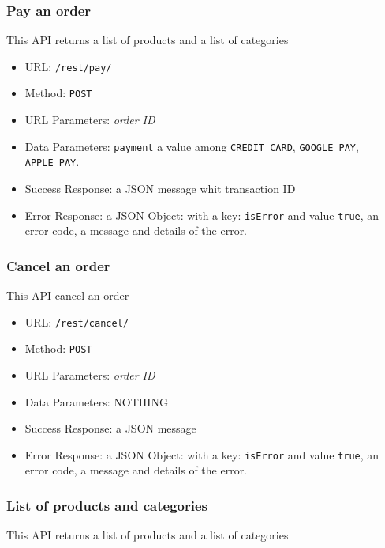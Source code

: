 \subsubsection*{Pay an order}

This API returns a list of products and a list of categories

\begin{itemize}
    \item URL: \texttt{/rest/pay/}
    \item Method: \texttt{POST}
    \item URL Parameters: \textit{order ID}
    \item Data Parameters: \texttt{payment} a value among \texttt{CREDIT\_CARD}, \texttt{GOOGLE\_PAY}, \texttt{APPLE\_PAY}.
    \item Success Response: a JSON message whit transaction ID
    \item Error Response: a JSON Object: with a key: \texttt{isError}  and value \texttt{true}, an error code, a message and details of the error.

\end{itemize}

\subsubsection*{Cancel an order}

This API cancel an order

\begin{itemize}
    \item URL: \texttt{/rest/cancel/}
    \item Method: \texttt{POST}
    \item URL Parameters: \textit{order ID}
    \item Data Parameters: NOTHING
    \item Success Response: a JSON message
    \item Error Response: a JSON Object: with a key: \texttt{isError}  and value \texttt{true}, an error code, a message and details of the error.

\end{itemize}

\subsubsection*{List of products and categories}

This API returns a list of products and a list of categories

